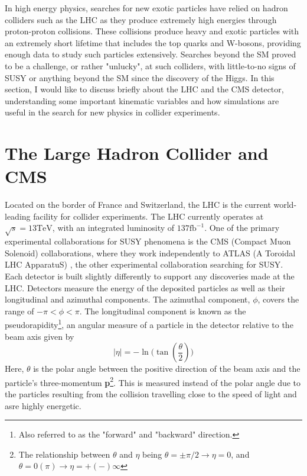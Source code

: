 In high energy physics, searches for new exotic particles have relied on hadron colliders such as the LHC as they produce extremely high energies through proton-proton collisions. These collisions produce heavy and exotic particles with an extremely short lifetime that includes the top quarks and W-bosons, providing enough data to study such particles extensively. Searches beyond the SM proved to be a  challenge, or rather "unlucky", at such colliders, with little-to-no signs of SUSY or anything beyond the SM since the discovery of the Higgs. In this section, I would like to discuss briefly about the LHC and the CMS detector, understanding some important kinematic variables and how simulations are useful in the search for new physics in collider experiments.

\section{The Large Hadron Collider and CMS}
\label{sec:Detector}
Located on the border of France and Switzerland, the LHC is the current world-leading facility for collider experiments. The LHC currently operates at $ \sqrt{s}=13 \text{TeV} $, with an integrated luminosity of $137\text{fb}^{-1}$. One of the primary experimental collaborations for SUSY phenomena is the CMS (Compact Muon Solenoid) \cite{chatrchyan2008cms} collaborations, where they work independently to ATLAS (A Toroidal LHC ApparatuS) \cite{collaboration2008atlas}, the other experimental collaboration searching for SUSY.  Each detector is built slightly differently to support any discoveries made at the LHC. Detectors measure the energy of the deposited particles as well as their longitudinal and azimuthal components. The azimuthal component, $\phi$, covers the range of $-\pi < \phi < \pi$. The longitudinal component is known as the pseudorapidity\footnote{Also referred to as the "forward" and "backward" direction.}, an angular measure of a particle in the detector relative to the beam axis given by
\begin{equation}
    |\eta|=-\ln\Big(\tan(\frac{\theta}{2})\Big)
    \label{eq:eta}
\end{equation}
Here, $\theta$ is the polar angle between the positive direction of the beam axis and the particle's three-momentum \textbf{p}\footnote{The relationship between $\theta$ and $\eta$ being $\theta = \pm \pi/2 \rightarrow \eta = 0$, and $\theta = 0(\pi) \rightarrow \eta = +(-) \infty$}. This is measured instead of the polar angle due to the particles resulting from the collision travelling close to the speed of light and asre highly energetic. \\

